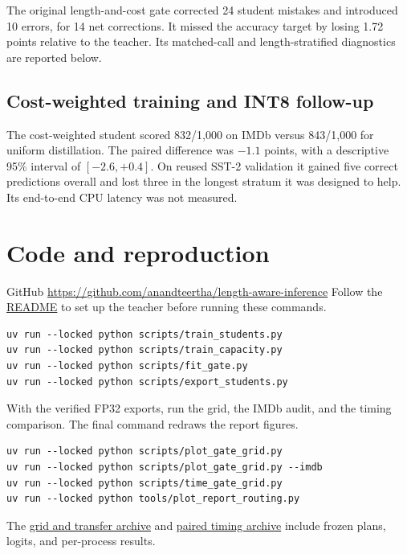\documentclass{article}
\begin{document}
The original length-and-cost gate corrected 24 student mistakes and introduced 10 errors, for 14 net corrections. It missed the accuracy target by losing 1.72 points relative to the teacher. Its matched-call and length-stratified diagnostics are reported below.



\subsection{Cost-weighted training and INT8 follow-up}
The cost-weighted student scored 832/1,000 on IMDb versus 843/1,000 for uniform distillation. The paired difference was \(-1.1\) points, with a descriptive 95\% interval of \([-2.6,+0.4]\). On reused SST-2 validation it gained five correct predictions overall and lost three in the longest stratum it was designed to help. Its end-to-end CPU latency was not measured.





\section{Code and reproduction}
GitHub \quad \url{https://github.com/anandteertha/length-aware-inference}\newline
Follow the \href{https://github.com/anandteertha/length-aware-inference#readme}{README} to set up the teacher before running these commands.
\begin{verbatim}
uv run --locked python scripts/train_students.py
uv run --locked python scripts/train_capacity.py
uv run --locked python scripts/fit_gate.py
uv run --locked python scripts/export_students.py
\end{verbatim}
With the verified FP32 exports, run the grid, the IMDb audit, and the timing comparison. The final command redraws the report figures.
\begin{verbatim}
uv run --locked python scripts/plot_gate_grid.py
uv run --locked python scripts/plot_gate_grid.py --imdb
uv run --locked python scripts/time_gate_grid.py
uv run --locked python tools/plot_report_routing.py
\end{verbatim}
The \href{https://github.com/anandteertha/length-aware-inference/tree/main/results/student-study/gate-grid}{grid and transfer archive} and \href{https://github.com/anandteertha/length-aware-inference/tree/main/results/student-study/gate-grid-timing}{paired timing archive} include frozen plans, logits, and per-process results.
\end{document}
